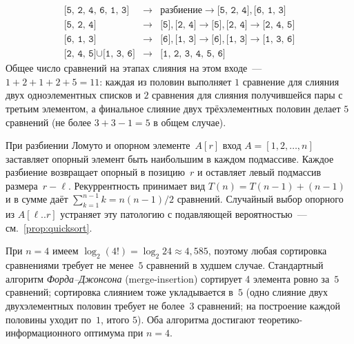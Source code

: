 \begin{example}
\label{ex:mergesort-trace}
\[
  \begin{array}{rcl}
    \texttt{[5, 2, 4, 6, 1, 3]} & \to & \texttt{разбиение} \to \texttt{[5, 2, 4]}, \texttt{[6, 1, 3]} \\
    \texttt{[5, 2, 4]} & \to & \texttt{[5]}, \texttt{[2, 4]} \to \texttt{[5]}, \texttt{[2, 4]} \to \texttt{[2, 4, 5]} \\
    \texttt{[6, 1, 3]} & \to & \texttt{[6]}, \texttt{[1, 3]} \to \texttt{[6]}, \texttt{[1, 3]} \to \texttt{[1, 3, 6]} \\
    \texttt{[2, 4, 5]} \cup \texttt{[1, 3, 6]} & \to & \texttt{[1, 2, 3, 4, 5, 6]}
  \end{array}
\]
Общее число сравнений на этапах слияния на этом входе~---
$1 + 2 + 1 + 2 + 5 = 11$: каждая из половин выполняет $1$ сравнение для
слияния двух одноэлементных списков и $2$ сравнения для слияния
получившейся пары с третьим элементом, а финальное слияние двух
трёхэлементных половин делает $5$ сравнений (не более $3 + 3 - 1 = 5$
в общем случае).
\end{example}

\begin{example}
\label{ex:quicksort-worst}
При разбиении Ломуто и опорном элементе~$A[r]$ вход $A = [1, 2, \dots, n]$
заставляет опорный элемент быть наибольшим в каждом подмассиве. Каждое
разбиение возвращает опорный в позицию~$r$ и оставляет левый подмассив
размера~$r - \ell$. Рекуррентность принимает вид
$T(n) = T(n - 1) + (n - 1)$ и в сумме даёт
$\sum_{k=1}^{n-1} k = n(n-1)/2$ сравнений. Случайный выбор опорного
из $A[\ell..r]$ устраняет эту патологию с подавляющей вероятностью~---
см.\ \cref{prop:quicksort}.
\end{example}

\begin{example}
\label{ex:lb-tight}
При $n = 4$ имеем $\log_2 (4!) = \log_2 24 \approx 4{,}585$, поэтому
любая сортировка сравнениями требует не менее~$5$ сравнений в худшем
случае. Стандартный алгоритм \emph{Форда--Джонсона} (merge-insertion)
сортирует 4 элемента ровно за~$5$ сравнений; сортировка слиянием
тоже укладывается в~$5$ (одно слияние двух двухэлементных половин
требует не более~$3$ сравнений; на построение каждой половины уходит
по~$1$, итого $5$). Оба алгоритма достигают теоретико-информационного
оптимума при $n = 4$.
\end{example}

